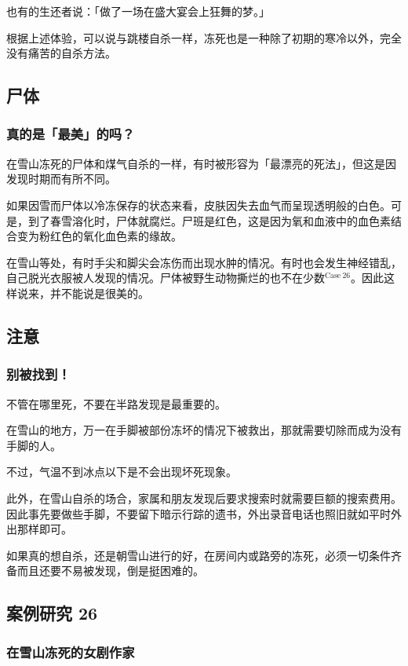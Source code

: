 \documentclass[UTF8]{ctexart}
\begin{document}
也有的生还者说：「做了一场在盛大宴会上狂舞的梦。」

根据上述体验，可以说与跳楼自杀一样，冻死也是一种除了初期的寒冷以外，完全没有痛苦的自杀方法。

\subsection{尸体}

\subsubsection*{真的是「最美」的吗？}

在雪山冻死的尸体和煤气自杀的一样，有时被形容为「最漂亮的死法」，但这是因发现时期而有所不同。

如果因雪而尸体以冷冻保存的状态来看，皮肤因失去血气而呈现透明般的白色。可是，到了春雪溶化时，尸体就腐烂。尸班是红色，这是因为氧和血液中的血色素结合变为粉红色的氧化血色素的缘故。

在雪山等处，有时手尖和脚尖会冻伤而出现水肿的情况。有时也会发生神经错乱，自己脱光衣服被人发现的情况。尸体被野生动物撕烂的也不在少数$^{\mathrm{Case\ 26}}$。因此这样说来，并不能说是很美的。

\subsection{注意}

\subsubsection*{别被找到！}

不管在哪里死，不要在半路发现是最重要的。

在雪山的地方，万一在手脚被部份冻坏的情况下被救出，那就需要切除而成为没有手脚的人。

不过，气温不到冰点以下是不会出现坏死现象。

此外，在雪山自杀的场合，家属和朋友发现后要求搜索时就需要巨额的搜索费用。因此事先要做些手脚，不要留下暗示行踪的遗书，外出录音电话也照旧就如平时外出那样即可。

如果真的想自杀，还是朝雪山进行的好，在房间内或路旁的冻死，必须一切条件齐备而且还要不易被发现，倒是挺困难的。

\subsection{案例研究 26}

\subsubsection*{在雪山冻死的女剧作家}
\end{document}
